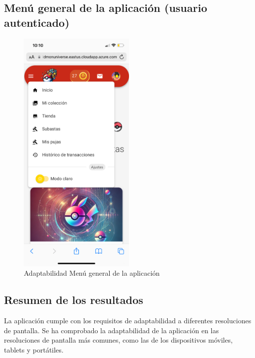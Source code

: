 \subsection*{Menú general de la aplicación (usuario autenticado)}
\begin{figure}[H]
    \centering
    \includegraphics[width=0.5\textwidth]{figures/adaptabilidad/menu.png}
    \caption{Adaptabilidad Menú general de la aplicación}
    \label{fig:Adap-Menu}
\end{figure}


\subsection*{Resumen de los resultados}
La aplicación cumple con los requisitos de adaptabilidad a diferentes resoluciones de pantalla.
Se ha comprobado la adaptabilidad de la aplicación en las resoluciones de pantalla más comunes, como las de los dispositivos móviles, tablets y portátiles.